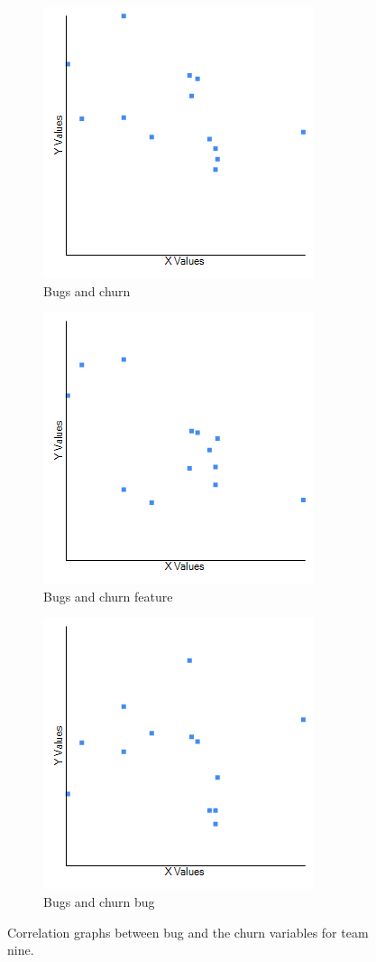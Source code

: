 \documentclass[UKenglish]{ifimaster}  %
\begin{document}
\begin{figure}[h] 
  \begin{subfigure}[b]{0.3\textwidth}
\includegraphics[scale=0.5]{Picture/Nine/BugsVSChrn.png}
 \caption{Bugs and churn} 
 \label{fig:a:9}
  \end{subfigure}
  \begin{subfigure}[b]{0.3\textwidth}
\includegraphics[scale=0.5]{Picture/Nine/BugsVSChrnFT.png}
 \caption{Bugs and churn feature} 
\label{fig:b:9}
  \end{subfigure}
  \begin{subfigure}[b]{0.3\textwidth}
\includegraphics[scale=0.5]{Picture/Nine/BugsVSChrnB.png}
 \caption{Bugs and churn bug} 
\label{fig:c:9}
  \end{subfigure}
\caption{Correlation graphs between bug and the churn variables for team nine.}
\label{corr:Difference:9}
\end{figure}
\end{document}
